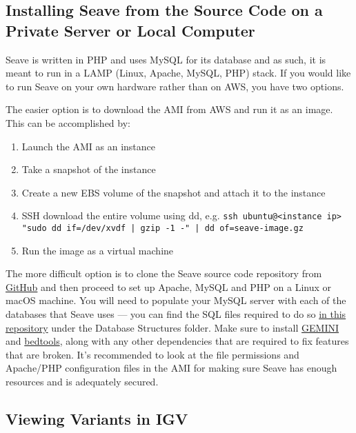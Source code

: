 \documentclass[11pt, a4paper]{article}
\newcommand{\GEMINI}{\href{https://gemini.readthedocs.io}{GEMINI} } %
\begin{document}

\subsection{Installing Seave from the Source Code on a Private Server or Local Computer}\label{localSeaveInstallation}

Seave is written in PHP and uses MySQL for its database and as such, it is meant to run in a LAMP (Linux, Apache, MySQL, PHP) stack. If you would like to run Seave on your own hardware rather than on AWS, you have two options. 

The easier option is to download the AMI from AWS and run it as an image. This can be accomplished by:

\begin{enumerate}
\item Launch the AMI as an instance
\item Take a snapshot of the instance
\item Create a new EBS volume of the snapshot and attach it to the instance
\item SSH download the entire volume using dd, e.g. \texttt{ssh ubuntu@<instance ip> "sudo dd if=/dev/xvdf | gzip -1 -" | dd of=seave-image.gz}
\item Run the image as a virtual machine
\end{enumerate}

The more difficult option is to clone the Seave source code repository from \href{https://github.com/KCCG/seave}{GitHub} and then proceed to set up Apache, MySQL and PHP on a Linux or macOS machine. You will need to populate your MySQL server with each of the databases that Seave uses --- you can find the SQL files required to do so \href{https://github.com/KCCG/seave-databases-annotations}{in this repository} under the Database Structures folder. Make sure to install \GEMINI and \href{https://github.com/arq5x/bedtools2}{bedtools}, along with any other dependencies that are required to fix features that are broken. It's recommended to look at the file permissions and Apache/PHP configuration files in the AMI for making sure Seave has enough resources and is adequately secured.


\subsection{Viewing Variants in IGV}
\end{document}
